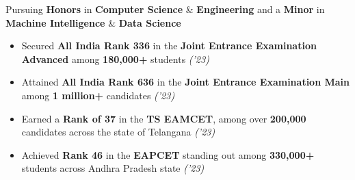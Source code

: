 \documentclass[10pt]{article}
\newcommand{\xfill}[2][1ex]{
	\dimen0=#2\advance\dimen0 by #1
	\leaders\hrule height \dimen0 depth -#1\hfill
}
\renewcommand{\section}[1]{
	\vspace{5pt}
	{\color{Blue}{\Large\scshape\raggedright #1\xfill[0pt]{0.5pt}}}
}
\begin{document}
{}

Pursuing \textbf{Honors} in \textbf{Computer Science} \& \textbf{Engineering} and a \textbf{Minor} in \textbf{Machine Intelligence} \& \textbf{Data Science}

\vspace{-9px}
\vspace{0.5em}
\section{Scholastic Achievements}
\vspace{2pt}
\begin{itemize}
    \item Secured {\bf All India Rank 336} in the \textbf{Joint Entrance Examination Advanced} among \textbf{180,000+} students \hfill{\sl \small ('23)} 

    \item Attained {\bf All India Rank 636} in the \textbf{Joint Entrance Examination Main} among \textbf{1 million+} candidates \hfill{\sl \small ('23)}
    
    \item Earned a {\bf Rank of 37} in the \textbf{TS EAMCET}, among over \textbf{200,000} candidates across the state of Telangana \hfill{\sl \small ('23)}
    
    \item Achieved {\bf Rank 46} in the \textbf{EAPCET} standing out among \textbf{330,000+} students across Andhra Pradesh state \hfill{\sl \small ('23)}
\end{itemize}

\vspace{-6px}

\section{Work Experience}
\end{document}

